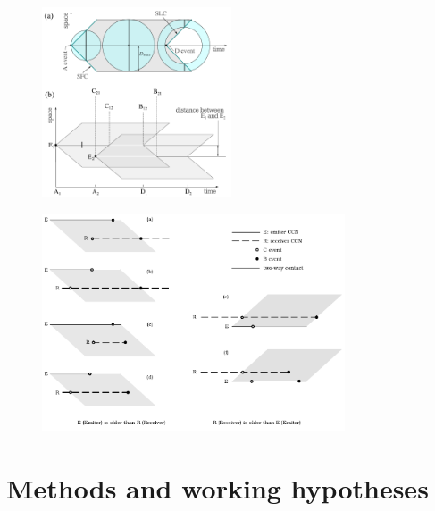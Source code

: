 
\begin{figure}
   \centering
   \includegraphics[width=0.5\textwidth]{F_scheme.pdf}
    \label{F_scheme}
\end{figure}
 
\begin{figure}
   \centering
   \includegraphics[width=0.8\textwidth]{F_messages.pdf}
    \label{F_messages}
\end{figure}
      

\section{Methods and working hypotheses}\label{S_methods}

